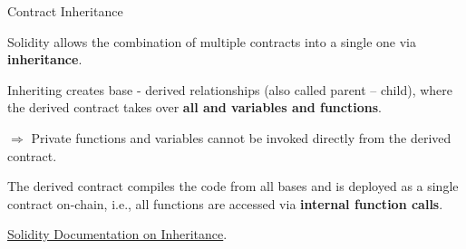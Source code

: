\documentclass[]{beamer}
\begin{document}
\begin{frame}{Contract Inheritance}

\vspace{0.5em}

\begin{minipage}{0.35\textwidth}
	\begin{figure}[t]
		\centering
		\begin{tikzpicture}[scale=0.9, every node/.style={scale=0.9}]
			
		\end{tikzpicture}
	\end{figure}
\end{minipage}
\begin{minipage}{0.63\textwidth}
	Solidity allows the combination of multiple contracts into a single one via \textbf{inheritance}.

	\vspace{0.5em}

	Inheriting creates base - derived relationships (also called parent – child), where the derived contract takes over \textbf{all  and  variables and functions}.
	
	\vspace{0.5em}

	$\Rightarrow$ Private functions and variables cannot be invoked directly from the derived contract.

\end{minipage}

\vspace{1em}

	The derived contract compiles the code from all bases and is deployed as a single contract on-chain, i.e.,  all functions are accessed via \textbf{internal function calls}. 

\vspace{1.5em}

\link \href{https://docs.soliditylang.org/en/latest/contracts.html\#inheritance}{Solidity Documentation on Inheritance}.

\end{frame}
\end{document}
